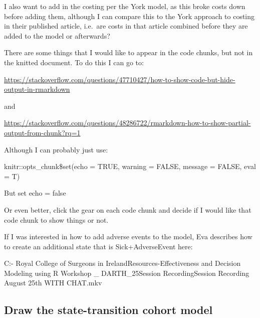\documentclass[
]{article}
\begin{document}
I also want to add in the costing per the York model, as this broke
costs down before adding them, although I can compare this to the York
approach to costing in their published article, i.e.~are costs in that
article combined before they are added to the model or afterwards?

There are some things that I would like to appear in the code chunks,
but not in the knitted document. To do this I can go to:

\url{https://stackoverflow.com/questions/47710427/how-to-show-code-but-hide-output-in-rmarkdown}

and

\url{https://stackoverflow.com/questions/48286722/rmarkdown-how-to-show-partial-output-from-chunk?rq=1}

Although I can probably just use:

knitr::opts\_chunk\$set(echo = TRUE, warning = FALSE, message = FALSE,
eval = T)

But set echo = false

Or even better, click the gear on each code chunk and decide if I would
like that code chunk to show things or not.

If I was interested in how to add adverse events to the model, Eva
describes how to create an additional state that is Sick+AdverseEvent
here:

C:\Users\Jonathan\OneDrive - Royal College of Surgeons in
Ireland\COLOSSUS\Training Resources\Cost-Effectiveness and Decision
Modeling using R Workshop \_ DARTH\August\_25\Live Session
Recording\Live Session Recording August 25th WITH CHAT.mkv

\hypertarget{draw-the-state-transition-cohort-model}{%
\subsection{Draw the state-transition cohort
model}\label{draw-the-state-transition-cohort-model}}
\end{document}
